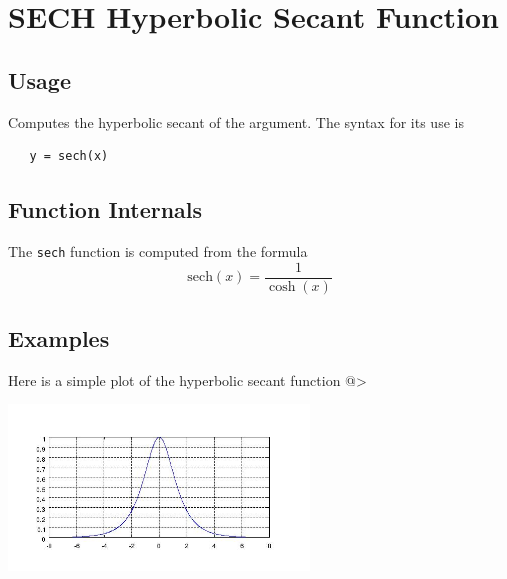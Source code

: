 \section{SECH Hyperbolic Secant Function}

\subsection{Usage}

Computes the hyperbolic secant of the argument.
The syntax for its use is
\begin{verbatim}
   y = sech(x)
\end{verbatim}
\subsection{Function Internals}

The \verb|sech| function is computed from the formula
\[
   \mathrm{sech}(x) = \frac{1}{\cosh(x)}
\]
\subsection{Examples}

Here is a simple plot of the hyperbolic secant function
@>


\centerline{\includegraphics[width=8cm]{sechplot}}

